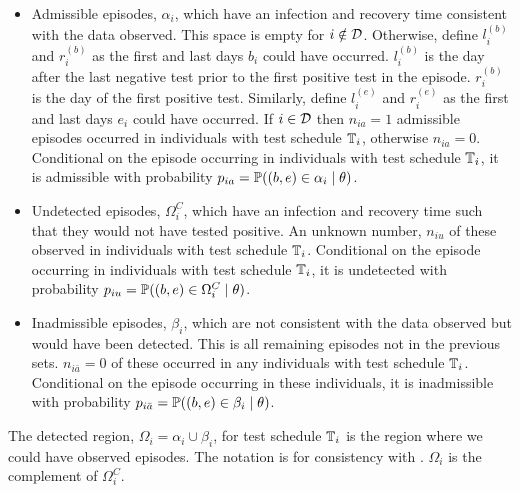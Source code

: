 \documentclass[thesis.tex]{subfiles}
\begin{document}
\begin{itemize}
\item
  Admissible episodes, $\alpha_i$, which have an infection and recovery time consistent with the data observed.
  This space is empty for $i \notin \mathcal{D}$.
  Otherwise, define $l_i^{(b)}$ and $r_i^{(b)}$ as the first and last days $b_i$ could have occurred.
  $l_i^{(b)}$ is the day after the last negative test prior to the first positive test in the episode.
  $r_i^{(b)}$ is the day of the first positive test.
  Similarly, define $l_i^{(e)}$ and $r_i^{(e)}$ as the first and last days $e_i$ could have occurred.
  If $i \in \mathcal{D}$ then $n_{ia} =1$ admissible episodes occurred in individuals with test schedule $\mathbb{T}_{i}$, otherwise $n_{ia} = 0$.
  Conditional on the episode occurring in individuals with test schedule $\mathbb{T}_i$, it is admissible with probability $p_{ia} = \operatorname{\mathbb{P}}((b, e) \in \alpha_i \mid \theta)$.
  \label{perf-test:def:admissible}
\item
  Undetected episodes, $\Omega_i^C$, which have an infection and recovery time such that they would not have tested positive.
  An unknown number, $n_{iu}$ of these observed in individuals with test schedule $\mathbb{T}_i$.
  Conditional on the episode occurring in individuals with test schedule $\mathbb{T}_i$, it is undetected with probability $p_{iu} = \operatorname{\mathbb{P}}((b, e) \in \Omega^C_i \mid \theta)$.
\item
  Inadmissible episodes, $\beta_i$, which are not consistent with the data observed but would have been
  detected.
  This is all remaining episodes not in the previous sets.
  $n_{i\bar{a}} = 0$ of these occurred in any individuals with test schedule $\mathbb{T}_i$.
  Conditional on the episode occurring in these individuals, it is inadmissible with probability $p_{i\bar{a}} = \operatorname{\mathbb{P}}((b, e) \in \beta_i \mid \theta)$.
\end{itemize}

The detected region, $\Omega_i = \alpha_i \cup \beta_i$, for test schedule $\mathbb{T}_i$ is the region where we could have observed episodes. 
The notation is for consistency with \textcite{heiseyModelling}.
$\Omega_i$ is the complement of $\Omega^C_i$.
\end{document}
